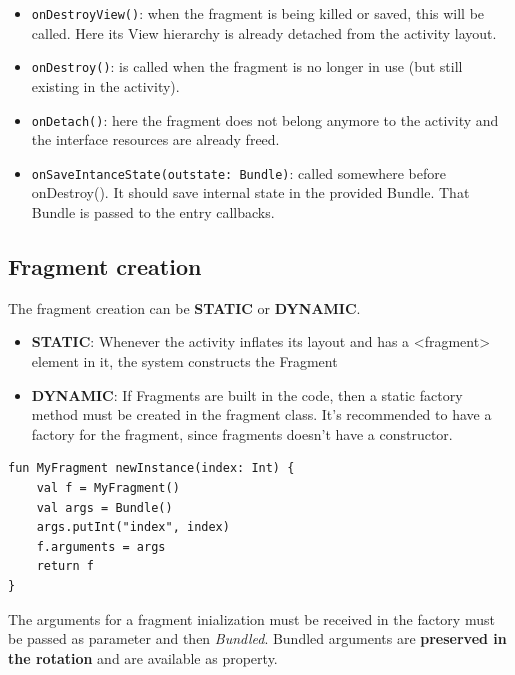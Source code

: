 \begin{itemize}
\item \texttt{onDestroyView()}: when the fragment is being killed or saved, this will be called. Here its View
hierarchy is already detached from the activity layout.

\item \texttt{onDestroy()}: is called when the fragment is no longer in use (but still existing in the activity).

\item \texttt{onDetach()}: here the fragment does not belong anymore to the activity and the interface
resources are already freed.

\item \texttt{onSaveIntanceState(outstate: Bundle)}: called somewhere before onDestroy(). It should save
internal state in the provided Bundle. That Bundle is passed to the entry callbacks.

\end{itemize}

\subsection{Fragment creation}

The fragment creation can be \textbf{STATIC} or \textbf{DYNAMIC}.

\begin{itemize}
    \item \textbf{STATIC}: Whenever the activity inflates its layout and has a <fragment> element in it, 
    the system constructs the Fragment
    \item \textbf{DYNAMIC}: If Fragments are built in the code, then a static factory method must be created in the fragment 
    class. It's recommended to have a factory for the fragment, since fragments doesn't have a constructor.
\end{itemize}

\begin{lstlisting}[title=Fragment Factory]
fun MyFragment newInstance(index: Int) {
    val f = MyFragment()
    val args = Bundle() 
    args.putInt("index", index)
    f.arguments = args
    return f
}
\end{lstlisting}

\begin{tcolorbox}[title=Bundled arguments]
    The arguments for a fragment inialization must be received in the factory must be passed as parameter
and then \textit{Bundled}. Bundled arguments are \textbf{preserved in the rotation} and are available as 
property.
\end{tcolorbox}

